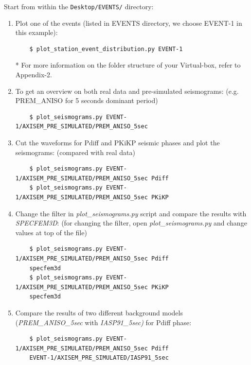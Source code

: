 \documentclass{article}
\begin{document}
Start from within the \verb|Desktop/EVENTS/| directory:

\begin{enumerate}
    
    \item Plot one of the events (listed in EVENTS directory, we choose EVENT-1 in this
    example):
    
    \begin{verbatim}
    $ plot_station_event_distribution.py EVENT-1
    \end{verbatim}
    * For more information on the folder structure of your Virtual-box, refer to
    Appendix-2.
    
    \item To get an overview on both real data and pre-simulated seismograms: 
    (e.g.  PREM\_ANISO for 5 seconds dominant period)
    \begin{verbatim}
    $ plot_seismograms.py EVENT-1/AXISEM_PRE_SIMULATED/PREM_ANISO_5sec
    \end{verbatim}
    
    \item Cut the waveforms for Pdiff and PKiKP seismic phases and plot the seismograms: 
    (compared with real data)
    \begin{verbatim}
    $ plot_seismograms.py EVENT-1/AXISEM_PRE_SIMULATED/PREM_ANISO_5sec Pdiff
    $ plot_seismograms.py EVENT-1/AXISEM_PRE_SIMULATED/PREM_ANISO_5sec PKiKP
    \end{verbatim}
    
    \item Change the filter in \textit{plot\_seismograms.py} script and compare the
    results with \textit{SPECFEM3D}: (for changing the filter, open
    \textit{plot\_seismograms.py} and change values at top of the file)
    
    \begin{verbatim}
    $ plot_seismograms.py EVENT-1/AXISEM_PRE_SIMULATED/PREM_ANISO_5sec Pdiff 
    specfem3d
    $ plot_seismograms.py EVENT-1/AXISEM_PRE_SIMULATED/PREM_ANISO_5sec PKiKP 
    specfem3d
    \end{verbatim}
    
    \item Compare the results of two different background models
    (\textit{PREM\_ANISO\_5sec} with \textit{IASP91\_5sec)} for Pdiff phase:
    
    \begin{verbatim}
    $ plot_seismograms.py EVENT-1/AXISEM_PRE_SIMULATED/PREM_ANISO_5sec Pdiff 
    EVENT-1/AXISEM_PRE_SIMULATED/IASP91_5sec
    \end{verbatim}
    

\end{enumerate}
\end{document}
